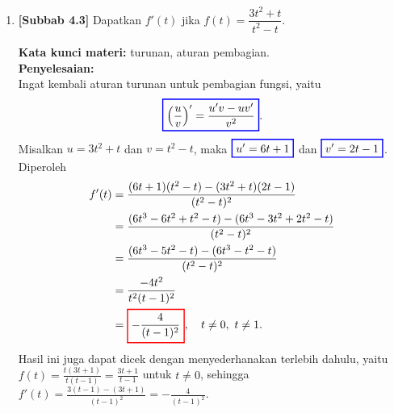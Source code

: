 \documentclass[10pt,openany,a4paper]{article}
\theoremstyle{definition}
\theoremstyle{definition}
\theoremstyle{plain}
\newenvironment{jawab}[2][tes]{%
\par\noindent\textbf{Kata kunci materi:} #1.\\
\textbf{Penyelesaian:} #2%
}{}
\begin{document}
\begin{enumerate}
    \item \textbf{[Subbab 4.3]} Dapatkan $f'(t)$ jika $f(t)=\dfrac{3t^2+t}{t^2-t}$.
    \begin{jawab}[turunan, aturan pembagian]{~\\
        Ingat kembali aturan turunan untuk pembagian fungsi, yaitu
        \[
        \colorlet{oldcolor}{.}
        \color{blue}
        \setlength{\fboxrule}{1pt} \boxed{\color{oldcolor}\left(\frac{u}{v}\right)' = \frac{u'v - uv'}{v^2}}\color{oldcolor}.
        \]
        Misalkan $u=3t^2+t$ dan $v=t^2-t$, maka $\colorlet{oldcolor}{.}
        \color{blue}
        \setlength{\fboxrule}{1pt} \boxed{\color{oldcolor}u'=6t+1}\color{oldcolor}$ dan $\colorlet{oldcolor}{.}
        \color{blue}
        \setlength{\fboxrule}{1pt} \boxed{\color{oldcolor}v'=2t-1}\color{oldcolor}$. Diperoleh
        \begin{align*}
            f'(t) &= \frac{(6t+1)(t^2-t)-(3t^2+t)(2t-1)}{(t^2-t)^2}\\
            &= \frac{(6t^3-6t^2+t^2-t)-(6t^3-3t^2+2t^2-t)}{(t^2-t)^2}\\
            &= \frac{(6t^3-5t^2-t)-(6t^3-t^2-t)}{(t^2-t)^2}\\
            &= \frac{-4t^2}{t^2(t-1)^2}\\
            &= \colorlet{oldcolor}{.}
        \color{red}
        \setlength{\fboxrule}{1pt} \boxed{\color{oldcolor}-\frac{4}{(t-1)^2}}\color{oldcolor}, \quad t\neq 0,~t\neq 1.
        \end{align*}
        Hasil ini juga dapat dicek dengan menyederhanakan terlebih dahulu, yaitu $f(t)=\frac{t(3t+1)}{t(t-1)}=\frac{3t+1}{t-1}$ untuk $t\neq 0$, sehingga $f'(t)=\frac{3(t-1)-(3t+1)}{(t-1)^2}=-\frac{4}{(t-1)^2}$.
    }
    \end{jawab}

\end{enumerate}

\newpage
\end{document}
